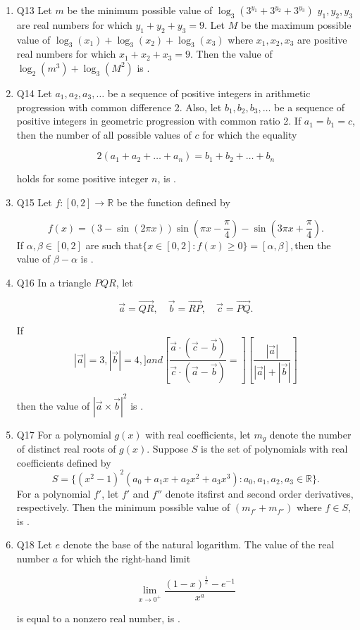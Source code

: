 \documentclass{article}
\begin{document}
\begin{enumerate}
\item Q13 Let $m$ be the minimum possible value of $\log_3(3^{y_1} + 3^{y_2} + 3^{y_3})$ $y_1, y_2, y_3$ are real numbers for which $y_1 + y_2 + y_3 = 9$. Let $M$ be the maximum possible value of $\log_3(x_1) + \log_3(x_2) + \log_3(x_3)$ where $x_1, x_2, x_3$ are positive real numbers for which $x_1 + x_2 + x_3 = 9$. Then the value of $\log_2(m^3) + \log_3(M^2)$ is \underline{\hspace{2cm}}.

\item Q14 Let $a_1, a_2, a_3, \dots $ be a sequence of positive integers in arithmetic progression with common difference 2. Also, let $b_1, b_2, b_3, \dots $ be a sequence of positive integers in geometric progression with common ratio 2. If $a_1 = b_1 = c$, then the number of all possible values of $c$ for which the equality 

\[
    2(a_1 + a_2 + \dots + a_n) = b_1 + b_2 + \dots + b_n
\]

    holds for some positive integer $n$, is \underline{\hspace{2cm}}.

\item Q15 Let $f: [0,2] \to \mathbb{R}$ be the function defined by

\[
    f(x) = (3 - \sin(2\pi x)) \sin\left(\pi x - \frac{\pi}{4}\right) - \sin(3\pi x + \frac{\pi}{4}).
\]
If $\alpha, \beta \in [0,2]$ are such that$\{ x \in [0,2] : f(x) \geq 0 \} = [\alpha, \beta],$then the value of $\beta - \alpha$ is \underline{\hspace{2cm}}.

\item Q16 In a triangle $PQR$, let 

   \[\vec{a} = \overrightarrow{QR}, \quad \vec{b} = \overrightarrow{RP}, \quad \vec{c} = \overrightarrow{PQ}.\]

If 
    \[|\vec{a}| = 3,  |\vec{b}| = 4,]and [\frac{\vec{a} \cdot (\vec{c} - \vec{b})}{\vec{c}\cdot(\vec{a} - \vec{b})}=][\frac{|\vec{a}|}{|\vec{a}| + |\vec{b}|}]\]

    then the value of $|\vec{a} \times \vec{b}|^2$ is \underline{\hspace{2cm}}.

\item Q17 For a polynomial $g(x)$ with real coefficients, let $m_g$ denote the number of distinct real roots of $g(x)$. Suppose $S$ is the set of polynomials with real coefficients defined by\[S = \{(x^2 - 1)^2 (a_0 + a_1 x + a_2 x^2 + a_3 x^3) : a_0, a_1, a_2, a_3 \in \mathbb{R} \}.\]For a polynomial $f'$, let $f'$ and $f''$ denote itsfirst and second order derivatives, respectively. Then the minimum possible value of $(m_{f'} + m_{f''})$ where $f \in S$, is \underline{\hspace{2cm}}.

\item Q18 Let $e$ denote the base of the natural logarithm. The value of the real number $a$ for which the right-hand limit

\[
    \lim_{x \to 0^+} \frac{(1 - x)^{\frac{1}{x}} - e^{-1}}{x^a}
\]

    is equal to a nonzero real number, is \underline{\hspace{2cm}}.


\end{enumerate}
\end{document}
